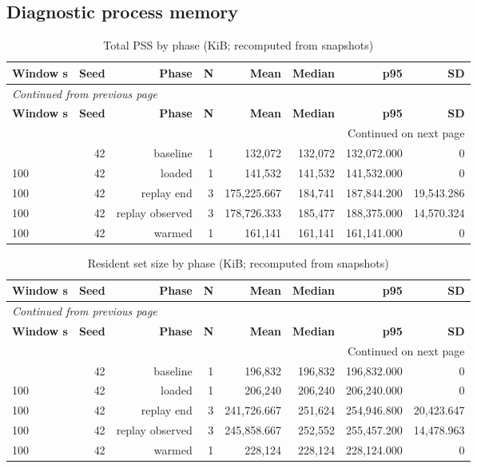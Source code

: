 \documentclass[10pt,a4paper]{article}
\begin{document}
\subsection{Diagnostic process memory}
\begingroup\small\setlength{\tabcolsep}{4pt}\renewcommand{\arraystretch}{1.12}
\begin{longtable}{@{}lrrrrrrr@{}}
\caption{Total PSS by phase (KiB; recomputed from snapshots)}\\
\toprule
\textbf{Window s} & \textbf{Seed} & \textbf{Phase} & \textbf{N} & \textbf{Mean} & \textbf{Median} & \textbf{p95} & \textbf{SD} \\
\midrule\endfirsthead
\multicolumn{8}{l}{\small\itshape Continued from previous page}\\
\toprule
\textbf{Window s} & \textbf{Seed} & \textbf{Phase} & \textbf{N} & \textbf{Mean} & \textbf{Median} & \textbf{p95} & \textbf{SD} \\
\midrule\endhead
\midrule\multicolumn{8}{r}{\small Continued on next page}\\\endfoot
\bottomrule\endlastfoot
100 & 42 & baseline & 1 & 132,072 & 132,072 & 132,072.000 & 0 \\
100 & 42 & loaded & 1 & 141,532 & 141,532 & 141,532.000 & 0 \\
100 & 42 & replay end & 3 & 175,225.667 & 184,741 & 187,844.200 & 19,543.286 \\
100 & 42 & replay observed & 3 & 178,726.333 & 185,477 & 188,375.000 & 14,570.324 \\
100 & 42 & warmed & 1 & 161,141 & 161,141 & 161,141.000 & 0 \\
\end{longtable}\endgroup
\begingroup\small\setlength{\tabcolsep}{4pt}\renewcommand{\arraystretch}{1.12}
\begin{longtable}{@{}lrrrrrrr@{}}
\caption{Resident set size by phase (KiB; recomputed from snapshots)}\\
\toprule
\textbf{Window s} & \textbf{Seed} & \textbf{Phase} & \textbf{N} & \textbf{Mean} & \textbf{Median} & \textbf{p95} & \textbf{SD} \\
\midrule\endfirsthead
\multicolumn{8}{l}{\small\itshape Continued from previous page}\\
\toprule
\textbf{Window s} & \textbf{Seed} & \textbf{Phase} & \textbf{N} & \textbf{Mean} & \textbf{Median} & \textbf{p95} & \textbf{SD} \\
\midrule\endhead
\midrule\multicolumn{8}{r}{\small Continued on next page}\\\endfoot
\bottomrule\endlastfoot
100 & 42 & baseline & 1 & 196,832 & 196,832 & 196,832.000 & 0 \\
100 & 42 & loaded & 1 & 206,240 & 206,240 & 206,240.000 & 0 \\
100 & 42 & replay end & 3 & 241,726.667 & 251,624 & 254,946.800 & 20,423.647 \\
100 & 42 & replay observed & 3 & 245,858.667 & 252,552 & 255,457.200 & 14,478.963 \\
100 & 42 & warmed & 1 & 228,124 & 228,124 & 228,124.000 & 0 \\
\end{longtable}\endgroup
\end{document}
